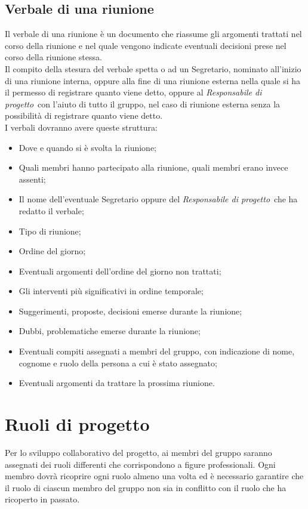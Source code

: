 \documentclass[float=false, crop=false]{standalone}
\newcommand{\responsabilediprogetto}{\textit{Responsabile di progetto}}
\begin{document}
		\subsection{Verbale di una riunione}
		Il verbale di una riunione è un documento che riassume gli argomenti trattati nel corso della riunione e nel quale vengono indicate eventuali decisioni prese nel corso della riunione stessa.\\ Il compito della stesura del verbale spetta o ad un Segretario, nominato all'inizio di una riunione interna, oppure alla fine di una riunione esterna nella quale si ha il permesso di registrare quanto viene detto, oppure al \responsabilediprogetto\ con l'aiuto di tutto il gruppo, nel caso di riunione esterna senza la possibilità di registrare quanto viene detto.\\ I verbali dovranno avere queste struttura:
		\begin{itemize}
		\item Dove e quando si è svolta la riunione;
		\item Quali membri hanno partecipato alla riunione, quali membri erano invece assenti;
		\item Il nome dell'eventuale Segretario oppure del \responsabilediprogetto\ che ha redatto il verbale;
		\item Tipo di riunione;
		\item Ordine del giorno;
		\item Eventuali argomenti dell'ordine del giorno non trattati;
		\item Gli interventi più significativi in ordine temporale;
		\item Suggerimenti, proposte, decisioni emerse durante la riunione;
		\item Dubbi, problematiche emerse durante la riunione;
		\item Eventuali compiti assegnati a membri del gruppo, con indicazione di nome, cognome e ruolo della persona a cui è stato assegnato;
		\item Eventuali argomenti da trattare la prossima riunione.
		\end{itemize}
	\section{Ruoli di progetto}
	Per lo sviluppo collaborativo del progetto, ai membri del gruppo saranno assegnati dei ruoli differenti che corrispondono a figure professionali. Ogni membro dovrà ricoprire ogni ruolo almeno una volta ed è necessario garantire che il ruolo di ciascun membro del gruppo non sia in conflitto con il ruolo che ha ricoperto in passato.
\end{document}
